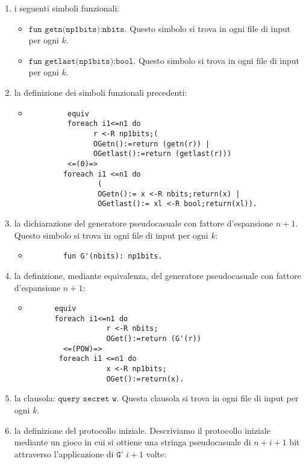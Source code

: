 \documentclass[a4paper,openright,twoside,12pt]{report}
\begin{document}
\begin{enumerate}
\item i seguenti simboli funzionali:
      \begin{itemize}
       \item $\texttt{fun getn(np1bits):nbits.}$ Questo simbolo si trova in ogni file di input per ogni $k$.
       \item $\texttt{fun getlast(np1bits):bool.}$ Questo simbolo si trova in ogni file di input per ogni $k$.
      \end{itemize}		
\item la definizione dei simboli funzionali precedenti:
      \begin{itemize}
       \item \begin{verbatim}
         equiv
         foreach i1<=n1 do
               r <-R np1bits;(
               OGetn():=return (getn(r)) |
               OGetlast():=return (getlast(r)))
         <=(0)=>
        foreach i1 <=n1 do
                (
                OGetn():= x <-R nbits;return(x) |
                OGetlast():= xl <-R bool;return(xl)).
             \end{verbatim}
      \end{itemize}
\item la dichiarazione del generatore pseudocasuale con fattore d'espansione $n+1$. Questo simbolo si trova in ogni file di input per ogni $k$:
\begin{itemize}
 \item \begin{verbatim}
        fun G'(nbits): np1bits.
       \end{verbatim}
\end{itemize}
\item la definizione, mediante equivalenza, del generatore pseudocasuale con fattore d'espansione $n+1$:
\begin{itemize}
 \item \begin{verbatim}
      equiv
      foreach i1<=n1 do
                  r <-R nbits;
                  OGet():=return (G'(r))
        <=(POW)=> 
       foreach i1 <=n1 do
                  x <-R np1bits;
                  OGet():=return(x).
       \end{verbatim}
\end{itemize}

\item la clausola: $\texttt{query secret w.}$ Questa clausola si trova in ogni file di input per ogni $k$.
\item la definizione del protocollo iniziale. Descriviamo il protocollo iniziale mediante un gioco in cui si 
ottiene una stringa pseudocasuale di $n+i+1$ bit attraverso l'applicazione di $\texttt{G'}$ $i+1$ volte:




\end{enumerate}
\end{document}
